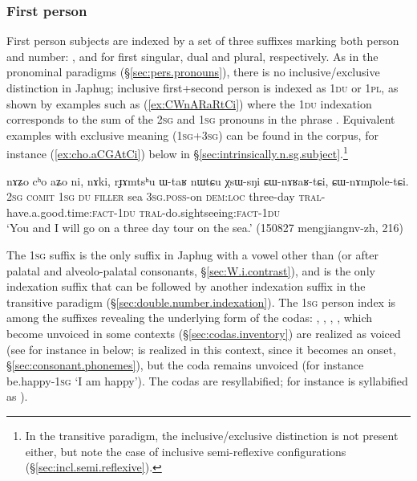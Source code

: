 \subsubsection{First person} \label{sec:intr.1}
First person subjects are indexed by a set of three suffixes marking both person and number: ,  and  for first singular, dual and plural, respectively. As in the pronominal paradigms (§\ref{sec:pers.pronouns}), there is no inclusive/exclusive distinction in Japhug; inclusive first+second person is indexed as \textsc{1du} or \textsc{1pl}, as shown by examples such as (\ref{ex:CWnARaRtCi}) where the \textsc{1du} indexation corresponds to the sum of the \textsc{2sg} and \textsc{1sg} pronouns in the phrase . Equivalent examples with exclusive meaning (\textsc{1sg}+\textsc{3sg}) can be found in the corpus, for instance (\ref{ex:cho.aCGAtCi}) below in §\ref{sec:intrinsically.n.sg.subject}.\footnote{In the transitive paradigm, the inclusive/exclusive distinction is not present either, but note the case of inclusive semi-reflex\-ive configurations (§\ref{sec:incl.semi.reflexive}).
}

\begin{exe}
\ex \label{ex:CWnARaRtCi}
\gll  nɤʑo cʰo aʑo ni, nɤki, rɟɤmtsʰu ɯ-taʁ nɯtɕu χsɯ-sŋi ɕɯ-nɤʁaʁ-tɕi, ɕɯ-nɤmɲole-tɕi. \\
\textsc{2sg} \textsc{comit} \textsc{1sg} \textsc{du} \textsc{filler} sea \textsc{3sg}.\textsc{poss}-on \textsc{dem}:\textsc{loc} three-day \textsc{tral}-have.a.good.time:\textsc{fact}-\textsc{1du} \textsc{tral}-do.sightseeing:\textsc{fact}-\textsc{1du} \\
\glt `You and I will go on a three day tour on the sea.' (150827 mengjiangnv-zh, 216)
\end{exe}

The \textsc{1sg}  suffix is the only suffix in Japhug with a vowel other than  (or  after palatal and alveolo-palatal consonants, §\ref{sec:W.i.contrast}), and is the only indexation suffix that can be followed by another indexation suffix in the transitive paradigm (§\ref{sec:double.number.indexation}). The  \textsc{1sg} person index is among the suffixes revealing the underlying form of the codas: , , , , which become unvoiced in some contexts (§\ref{sec:codas.inventory}) are realized as voiced (see for instance in  below;  is realized  in this context, since it becomes an onset, §\ref{sec:consonant.phonemes}), but the coda  remains unvoiced (for instance  be.happy-\textsc{1sg} `I am happy'). The codas are resyllabified; for instance  is syllabified as ).

